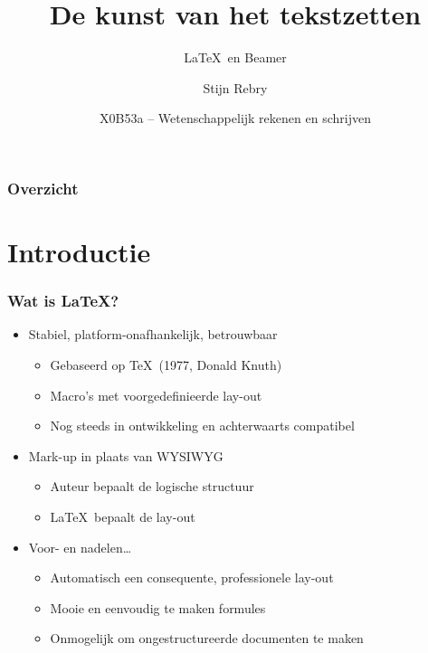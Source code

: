 \documentclass[kulak,outline]{kulakbeamer} %
\title[\LaTeX\ en Beamer]{De kunst van het tekstzetten}
\subtitle{\LaTeX\ en Beamer}
\author{Stijn Rebry}
\institute[Kulak]{Groep Wetenschap \& Technologie, Kulak}
\date{X0B53a -- Wetenschappelijk rekenen en schrijven}
\begin{document}
	
	\begin{titleframe}
	\titlepage
\end{titleframe}

\begin{outlineframe}\frametitle{Overzicht}
	\tableofcontents[hideallsubsections]
\end{outlineframe}

\section{Introductie}

\begin{frame}[t]
\frametitle{Wat is LaTeX?}
\begin{itemize}
	\item Stabiel, platform-onafhankelijk, betrouwbaar
	\begin{itemize}
		\item Gebaseerd op \TeX\ (1977, Donald Knuth)
		\item Macro's met voorgedefinieerde lay-out
		\item Nog steeds in ontwikkeling en achterwaarts compatibel
	\end{itemize}
	\item Mark-up in plaats van WYSIWYG
	\begin{itemize}
		\item Auteur bepaalt de logische structuur
		\item \LaTeX\ bepaalt de lay-out
	\end{itemize}
	\item Voor- en nadelen\ldots
	\begin{itemize}
		\item Automatisch een consequente, professionele lay-out
		\item Mooie en eenvoudig te maken formules
		\item Onmogelijk om ongestructureerde documenten te maken
	\end{itemize}
\end{itemize}
\end{frame}

\end{document}
